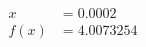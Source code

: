 \documentclass[preview]{standalone}
\begin{document}
\begin{align*}
x &= 0.0002\\f(x) &= 4.0073254
\end{align*}
\end{document}
